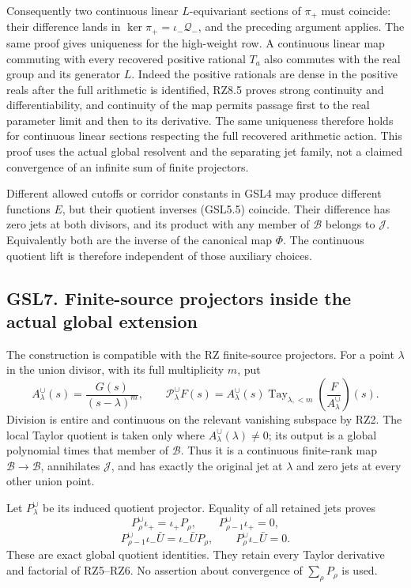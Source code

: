 Consequently two continuous linear \(L\)-equivariant sections of
\(\pi_+\) must coincide: their difference lands in
\(\ker\pi_+=\iota_-\mathcal Q_-\), and the preceding argument applies.
The same proof gives uniqueness for the high-weight row. A continuous
linear map commuting with every recovered positive rational \(T_a\) also
commutes with the real group and its generator \(L\). Indeed the
positive rationals are dense in the positive reals after the full
arithmetic is identified, RZ8.5 proves strong continuity and
differentiability, and continuity of the map permits passage first to
the real parameter limit and then to its derivative. The same uniqueness
therefore holds for continuous linear sections respecting the full
recovered arithmetic action. This proof uses the actual global resolvent
and the separating jet family, not a claimed convergence of an infinite
sum of finite projectors.

Different allowed cutoffs or corridor constants in GSL4 may produce
different functions \(E\), but their quotient inverses (GSL5.5)
coincide. Their difference has zero jets at both divisors, and its
product with any member of \(\mathcal B\) belongs to \(\mathcal J\).
Equivalently both are the inverse of the canonical map \(\Phi\). The
continuous quotient lift is therefore independent of those auxiliary
choices.

\subsection{GSL7. Finite-source projectors inside the actual global
extension}\label{gsl7.-finite-source-projectors-inside-the-actual-global-extension}

The construction is compatible with the RZ finite-source projectors. For
a point \(\lambda\) in the union divisor, with its full multiplicity
\(m\), put \[
A_\lambda^{\cup}(s)=\frac{G(s)}{(s-\lambda)^m},\qquad
\mathscr P_\lambda^{\cup}F(s)=
A_\lambda^{\cup}(s)\operatorname{Tay}_{\lambda,<m}
 \left(\frac{F}{A_\lambda^{\cup}}\right)(s).
\tag{GSL7.1}
\] Division is entire and continuous on the relevant vanishing subspace
by RZ2. The local Taylor quotient is taken only where
\(A_\lambda^{\cup}(\lambda)\ne0\); its output is a global polynomial
times that member of \(\mathcal B\). Thus it is a continuous finite-rank
map \(\mathcal B\to\mathcal B\), annihilates \(\mathcal J\), and has
exactly the original jet at \(\lambda\) and zero jets at every other
union point.

Let \(P_\lambda^{\cup}\) be its induced quotient projector. Equality of
all retained jets proves \[
P_\rho^{\cup}\iota_+=\iota_+P_\rho,
\qquad P_{\rho-1}^{\cup}\iota_+=0,
\tag{GSL7.2}
\] \[
P_{\rho-1}^{\cup}\iota_-\bar U
 =\iota_-\bar U P_\rho,
\qquad P_\rho^{\cup}\iota_-\bar U=0.
\tag{GSL7.3}
\] These are exact global quotient identities. They retain every Taylor
derivative and factorial of RZ5--RZ6. No assertion about convergence of
\(\sum_\rho P_\rho\) is used.

